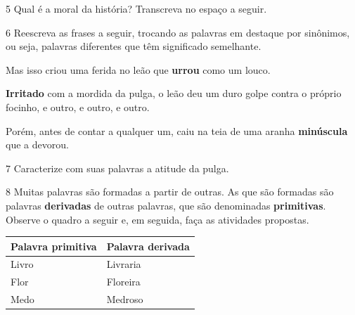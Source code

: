 \num{5} Qual é a moral da história? Transcreva no espaço a seguir.


\num{6} Reescreva as frases a seguir, trocando as palavras em destaque por
sinônimos, ou seja, palavras diferentes que têm significado
semelhante.


\begin{escolha}[itemsep=-5pt]
\item Mas isso criou uma ferida no leão que \textbf{urrou} como um louco.

\item \textbf{Irritado} com a mordida da pulga, o leão deu um duro golpe contra o próprio focinho, e outro, e outro, e outro.

\item Porém, antes de contar a qualquer um, caiu na teia de uma aranha \textbf{minúscula} que a devorou.
\end{escolha}

\num{7} Caracterize com suas palavras a atitude da pulga.

\num{8} Muitas palavras são formadas a partir de outras. As que são formadas são
palavras \textbf{derivadas} de outras palavras, que são denominadas
\textbf{primitivas}. Observe o quadro a seguir e, em seguida, faça as
atividades propostas.

\begin{center}
\begin{tabular}{ll}
\hline
\textbf{Palavra primitiva} & \textbf{Palavra derivada} \\ \hline
Livro & Livraria\\
Flor & Floreira\\
Medo & Medroso\\ \hline
\end{tabular}
\end{center}

